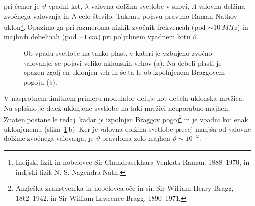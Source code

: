 pri čemer je $\vartheta$ vpadni kot, $\lambda$ valovna dolžina svetlobe v snovi, 
$\Lambda$ valovna dolžina zvočnega valovanja in 
$N$ celo število. Takemu pojavu 
pravimo Raman-Nathov uklon\footnote{Indijski fizik in nobelovec Sir Chandrasekhara 
Venkata Raman, 1888--1970, 
in indijski fizik N. S. Nagendra Nath.}. 
Opazimo ga pri razmeroma nizkih zvočnih frekvencah 
(pod $\sim10~\si{MHz}$) in majhnih debelinah (pod $\sim 1~\si{cm}$) pri poljubnem vpadnem 
kotu $\vartheta$.
\begin{figure}[ht]
\centering
\def\svgwidth{110truemm} 

\caption{Ob vpadu svetlobe na tanko plast, v kateri je vzbujeno zvočno valovanje, se 
pojavi veliko uklonskih vrhov (a). Na debeli plasti je opazen zgolj en uklonjen vrh in  
še ta le ob izpolnjenem Braggovem pogoju (b).}
\label{fig:ao_bragg}
\end{figure}
V nasprotnem limitnem primeru modulator deluje 
kot debela uklonska mrežica. 
Na splošno je delež uklonjene svetlobe na taki mrežici neuporabno majhen. 
Znaten postane le tedaj, kadar je izpolnjen Braggov
pogoj\footnote{Angleška znanstvenika in nobelovca oče in sin Sir William Henry Bragg, 1862--1942,
in Sir William Lawrence Bragg, 1890--1971.}
in je vpadni kot enak uklonjenemu (slika~\ref{fig:ao_bragg}\,b).
Ker je valovna dolžina svetlobe precej manjša od valovne dolžine zvočnega valovanja, je $\vartheta$
praviloma zelo majhen $\vartheta \sim 10^{-2}$. 

